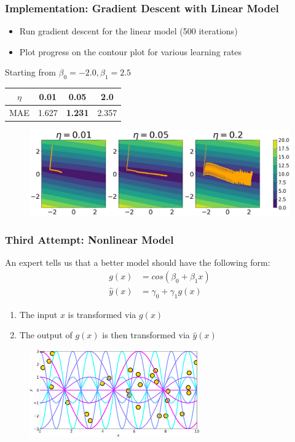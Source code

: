 \documentclass{beamer}
\begin{document}
\begin{frame}
\frametitle{Implementation: Gradient Descent with Linear Model}

\begin{itemize}
\item Run gradient descent for the linear model (500 iterations)
\item Plot progress on the contour plot for various learning rates
\end{itemize}

\centering
Starting from $\beta_0 = -2.0, \beta_1 = 2.5$

\begin{tabular}{|c|c|c|c|}
\hline 
$\eta$ & 0.01 & \textbf{0.05} & 2.0\tabularnewline
\hline 
\hline 
MAE & 1.627 & \textbf{1.231} & 2.357\tabularnewline
\hline 
\end{tabular}


\begin{figure}
\includegraphics[width=\textwidth]{../figures/linear_gd_steps.png}
\end{figure}


\end{frame}

\begin{frame}
\frametitle{Third Attempt: Nonlinear Model}

An expert tells us that a better model should have the following form:
\begin{align*}
g(x) & =cos(\beta_{0}+\beta_{1}x)\\
\hat{y}(x) & =\gamma_{0}+\gamma_{1}g(x)
\end{align*}

\begin{enumerate}
\item The input $x$ is  transformed via $g(x)$
\item The output of $g(x)$ is then transformed via $\hat{y}(x)$
\end{enumerate}

\begin{figure}
\includegraphics[width=0.65\textwidth]{../figures/nonlinear_priors.png}
\end{figure}

\end{frame}
\end{document}
